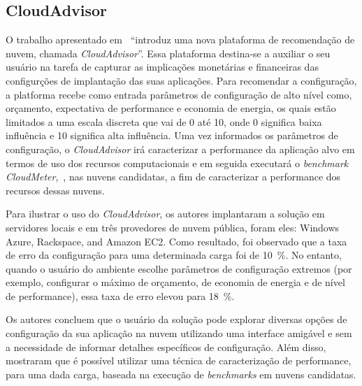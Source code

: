 \subsection{CloudAdvisor}
O trabalho apresentado em~\cite{jung2013cloudadvisor} ``introduz uma nova plataforma de recomendação de nuvem, chamada {\em CloudAdvisor}''. Essa plataforma destina-se a auxiliar o seu usuário na tarefa de capturar as implicações monetárias e financeiras das configurções de implantação das suas aplicações. Para recomendar a configuração, a platforma recebe como entrada parâmetros de configuração de alto nível como, orçamento, expectativa de performance e economia de energia, os quais estão limitados a uma escala discreta que vai de 0 até 10, onde 0 significa baixa influência e 10 significa alta influência. Uma vez informados os parâmetros de configuração, o {\em CloudAdvisor} irá caracterizar a performance da aplicação alvo em termos de uso dos recursos computacionais e em seguida executará o {\em benchmark} {\em CloudMeter},~\cite{jung2013cloudadvisor}, nas nuvens candidatas, a fim de caracterizar a performance dos recursos dessas nuvens.

Para ilustrar o uso do {\em CloudAdvisor}, os autores implantaram a solução em servidores locais e em três provedores de nuvem pública, foram eles: Windows Azure, Rackspace, and Amazon EC2. Como resultado, foi observado que a taxa de erro da configuração para uma determinada carga foi de 10~\%. No entanto, quando o usuário do ambiente escolhe parâmetros de configuração extremos (por exemplo, configurar o máximo de orçamento, de economia de energia e de nível de performance), essa taxa de erro elevou para 18~\%.

Os autores concluem que o usuário da solução pode explorar diversas opções de configuração da sua aplicação na nuvem utilizando uma interface amigável e sem a necessidade de informar detalhes específicos de configuração. Além disso, mostraram que é possível utilizar uma técnica de caracterização de performance, para uma dada carga, baseada na execução de {\em benchmarks} em nuvens candidatas.

